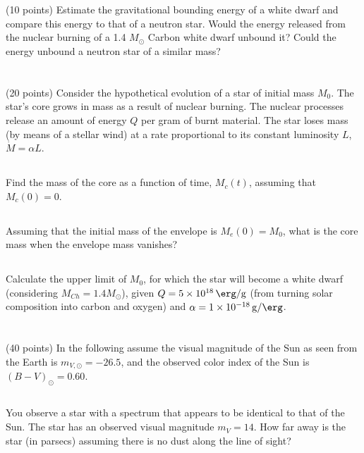 \section{}(10 points)
Estimate the gravitational bounding energy of a white dwarf and compare this energy to that of a neutron star. Would the energy released from the nuclear burning of a 1.4 $M_\odot$ Carbon white dwarf unbound it? Could the energy unbound a neutron star
of a similar mass?


\section{}(20 points)
Consider the hypothetical evolution of a star of initial mass $M_0$.
The star's core grows in mass as a result of nuclear burning.
The nuclear processes release an amount of energy $Q$ per gram of burnt material. 
The star loses mass (by means of a stellar wind) at a rate proportional to its constant luminosity $L$, $\Dot{M} = \alpha L$.
\subsection{}
Find the mass of the core as a function of time, $M_c(t)$, assuming that $M_c(0) = 0$.
\subsection{}
Assuming that the initial mass of the envelope is $M_e(0) = M_0$, what is the core mass when the envelope mass vanishes?
\subsection{}
Calculate the upper limit of $M_0$, for which the star will become a white dwarf (considering $M_{Ch} = 1.4M_\odot$), given $Q = \SI{5e18}{\erg\per\g}$ (from turning solar composition
into carbon and oxygen) and $\alpha = \SI{1e-18}{g\per\erg}$.


\section{}(40 points)
In the following assume the visual magnitude of the Sun as seen from the Earth is $m_{V,\odot} = -26.5$, and the observed color index of the Sun is $(B-V)_\odot = 0.60$.
\subsection{}
You observe a star with a spectrum that appears to be identical to that of the Sun.
The star has an observed visual magnitude $m_V = 14$. How far away is the star (in parsecs) assuming there is no dust along the line of sight?
